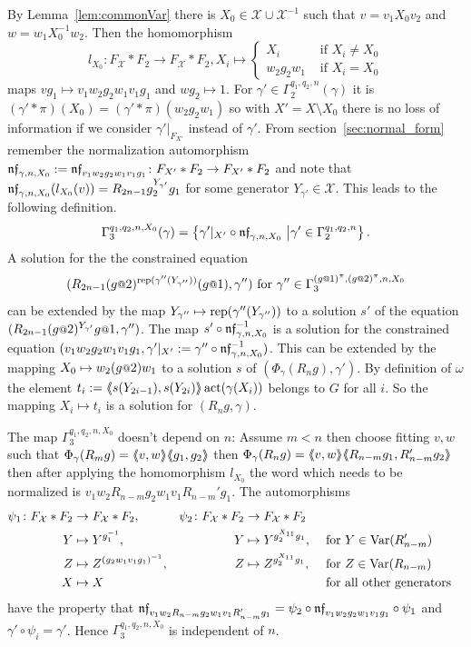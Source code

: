 \documentclass[a4paper,11pt]{amsart}
\begin{document}
 By Lemma~\ref{lem:commonVar} there is 
 $X_0 \in \mathcal{X}\cup \mathcal{X}^{-1}$ such that $v=v_1X_0v_2$ and $w=w_1X_0^{-1}w_2$. Then the homomorphism
 \[l_{X_0}\colon F_{\mathcal{X}}*F_2\to F_{\mathcal{X}}*F_2, X_i \mapsto \begin{cases}
						X_i &\text{ if } X_i\neq {X_0} \\
						w_2g_2w_1 &\text{ if }X_i= {X_0} 
                                             \end{cases}\]
 maps $vg_1 \mapsto v_1w_2g_2w_1v_1g_1$ and $wg_2\mapsto 1$. 
 For $\gamma'\in \Gamma_2^{q_1,q_2,n}(\gamma)$ it is $(\gamma'*\pi)(X_0)=({\gamma'*\pi})(w_2g_2w_1)$ so with $X'=X\setminus X_0$ there is no loss of information if 
 we consider $\gamma'|_{F_{X'}}$ instead of $\gamma'$.
 From section~\ref{sec:normal_form} remember the normalization 
 automorphism $\mathfrak{nf}_{\gamma,n,X_0}:=\mathfrak{nf}_{v_1w_2g_2w_1v_1g_1}\colon F_{X'}*F_2 \to F_{X'}*F_2$
  and note that
 $\mathfrak{nf}_{\gamma,n,X_0}(l_{X_0}(v))=R_{2n-1}g_2^{{Y_{\gamma'}}}g_1$ for some generator ${Y_{\gamma'}}\in\mathcal{X}$.
 This leads to the following definition.
 \[\Gamma_3^{q_1,q_2,n,X_0}(\gamma) = \left\{\gamma'|_{X'} \circ \mathfrak{nf}_{\gamma,n,X_0} \ \middle \vert \gamma' \in \Gamma_2^{q_1,q_2,n} \right\}.\] 
 A solution for the the constrained equation
 \[(R_{2n-1}(g\at2)^{\textup{rep}(\gamma''({Y_{\gamma''}}))}(g\at1),\gamma'')\textup{ for }\gamma'' \in \Gamma_3^{(g\at{1})^\pi,(g\at{2})^\pi,n,X_0}\]
 can be 
 extended by the map ${Y_{\gamma''}}\mapsto \textup{rep}(\gamma''({Y_{\gamma''}}))$ to a solution $s'$ 
 of the equation $(R_{2n-1} (g\at{2})^{{Y_{\gamma'}}} g\at{1},\gamma'')$. The map $s'\circ \mathfrak{nf}_{\gamma,n,X_0}^{-1}$ 
 is a solution for the constrained equation $(v_1w_2g_2w_1v_1g_1,\gamma'|_{X'}:=\gamma'' \circ \mathfrak{nf}_{\gamma,n,X_0}^{-1})$.
 This can be extended by the mapping $X_0\mapsto w_2(g\at{2})w_1$ to a solution $s$ of $(\Phi_\gamma(R_n g),\gamma')$.
 By definition of $\omega$ the element $t_i:=\langle\negthickspace\langle s(Y_{2i-1}),s(Y_{2i})\rangle\negthickspace\rangle\operatorname{act}(\gamma(X_i))$ belongs to  $G$ for all $i$. So the mapping $X_i\mapsto t_i$ is a solution for $(R_ng,\gamma)$.
 
 The map $\Gamma_3^{q_1,q_2,n,X_0}$ doesn't depend on %
 $n$: Assume $m<n$ then choose  
 fitting $v,w$ such that $\Phi_\gamma(R_mg)=\langle\negthickspace\langle v,w\rangle\negthickspace\rangle\langle\negthickspace\langle g_1,g_2\rangle\negthickspace\rangle$ then $\Phi_\gamma(R_ng)=\langle\negthickspace\langle v,w\rangle\negthickspace\rangle\langle\negthickspace\langle R_{n-m}g_1,R_{n-m}'g_2\rangle\negthickspace\rangle$ 
 then after applying the homomorphism $l_{X_0}$ 
 the word which needs to be normalized is $v_1w_2R_{n-m}g_2w_1v_1R_{n-m}'g_1$. The automorphisms
 \begin{align*}
 \psi_1 \colon F_{\mathcal{X}}*F_2 &\to F_{\mathcal{X}}*F_2, & \psi_2 \colon F_{\mathcal{X}}*F_2 &\to F_{\mathcal{X}}*F_2\\
 Y &\mapsto Y^{g_1^{-1}}, & Y &\mapsto Y^{g_2^{X_{11}}g_1}, & &\text{ for }Y\in \textup{Var}(R_{n-m}')\\
 Z &\mapsto Z^{(g_2w_1v_1g_1)^{-1}},& Z &\mapsto Z^{g_2^{X_{11}}g_1},  & &\text{ for }Z\in \textup{Var}(R_{n-m})\\
 X &\mapsto X & & & &\text{ for all other generators}
 \end{align*}
 have the property that $\mathfrak{nf}_{v_1w_2R_{n-m}g_2w_1v_1R_{n-m}'g_1} = \psi_2\circ\mathfrak{nf}_{v_1w_2g_2w_1v_1g_1}\circ \psi_1$ and 
 $\gamma' \circ \psi_i = \gamma'$. Hence $\Gamma_3^{q_1,q_2,n,X_0}$ is independent of $n$.
 
\end{document}
